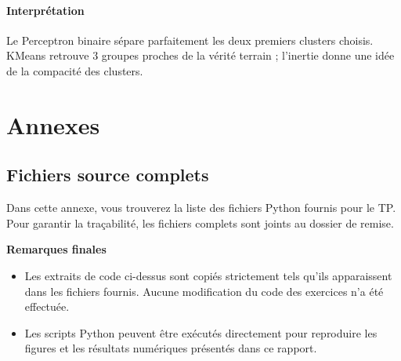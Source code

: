 \documentclass[12pt,a4paper]{article}
\begin{document}
\paragraph{Interprétation}
Le Perceptron binaire sépare parfaitement les deux premiers clusters choisis.
KMeans retrouve 3 groupes proches de la vérité terrain ;
l'inertie donne une idée de la compacité des clusters.


\clearpage
\section*{Annexes}

\subsection*{Fichiers source complets}
Dans cette annexe, vous trouverez la liste des fichiers Python fournis
pour le TP. Pour garantir la traçabilité, les fichiers complets sont
joints au dossier de remise.

\vspace{1cm}
\textbf{Remarques finales}
\begin{itemize}
    \item Les extraits de code ci-dessus sont copiés strictement tels
          qu'ils apparaissent dans les fichiers fournis.
          Aucune modification du code des exercices n'a été effectuée.
    \item Les scripts Python peuvent être exécutés directement pour
          reproduire les figures et les résultats numériques présentés
          dans ce rapport.
\end{itemize}
\end{document}
